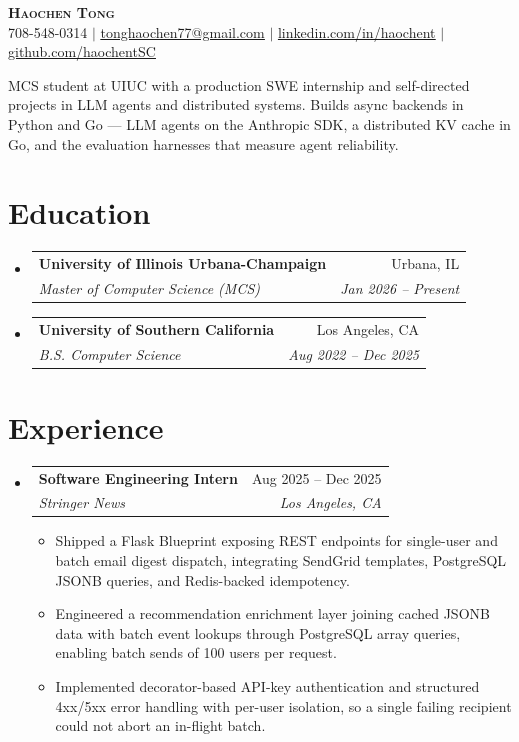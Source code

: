 \documentclass[letterpaper,11pt]{article}
\makeatletter
\newcommand{\resumeItem}[1]{
  \item\small{
    {#1 \vspace{-2pt}}
  }
}
\newcommand{\resumeSubheading}[4]{
  \vspace{-2pt}\item
    \begin{tabular*}{0.97\textwidth}[t]{l@{\extracolsep{\fill}}r}
      \textbf{#1} & #2 \\
      \textit{\small#3} & \textit{\small #4} \\
    \end{tabular*}\vspace{-7pt}
}
\newcommand{\resumeSubHeadingListStart}{\begin{itemize}[leftmargin=0.15in, label={}]}
\newcommand{\resumeSubHeadingListEnd}{\end{itemize}}
\newcommand{\resumeItemListStart}{\begin{itemize}}
\newcommand{\resumeItemListEnd}{\end{itemize}\vspace{-5pt}}
\makeatother
\begin{document}
\begin{center}
    \textbf{\Huge \scshape Haochen Tong} \\ \vspace{1pt}
    \small 708-548-0314 $|$ \href{mailto:tonghaochen77@gmail.com}{\underline{tonghaochen77@gmail.com}} $|$ \href{https://linkedin.com/in/haochent}{\underline{linkedin.com/in/haochent}} $|$ \href{https://github.com/haochentSC}{\underline{github.com/haochentSC}}
\end{center}

\vspace{-6pt}
\small MCS student at UIUC with a production SWE internship and self-directed projects in LLM agents and distributed systems. Builds async backends in Python and Go --- LLM agents on the Anthropic SDK, a distributed KV cache in Go, and the evaluation harnesses that measure agent reliability.
\vspace{2pt}

\section{Education}
  \resumeSubHeadingListStart
    \resumeSubheading
      {University of Illinois Urbana-Champaign}{Urbana, IL}
      {Master of Computer Science (MCS)}{Jan 2026 -- Present}
    \resumeSubheading
      {University of Southern California}{Los Angeles, CA}
      {B.S. Computer Science}{Aug 2022 -- Dec 2025}
  \resumeSubHeadingListEnd

\section{Experience}
  \resumeSubHeadingListStart
\resumeSubheading
  {Software Engineering Intern}{Aug 2025 -- Dec 2025}
  {Stringer News}{Los Angeles, CA}
  \resumeItemListStart
    \resumeItem{Shipped a Flask Blueprint exposing REST endpoints for single-user and batch email digest dispatch, integrating SendGrid templates, PostgreSQL JSONB queries, and Redis-backed idempotency.}
    \resumeItem{Engineered a recommendation enrichment layer joining cached JSONB data with batch event lookups through PostgreSQL array queries, enabling batch sends of 100 users per request.}
    \resumeItem{Implemented decorator-based API-key authentication and structured 4xx/5xx error handling with per-user isolation, so a single failing recipient could not abort an in-flight batch.}
  \resumeItemListEnd
  \resumeSubHeadingListEnd
\end{document}
